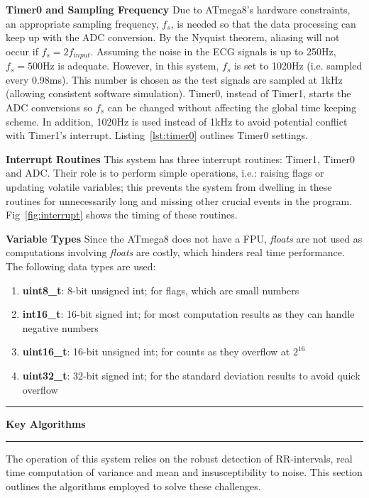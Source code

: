 \documentclass[11pt]{article}
\newcommand\question[2]{\vspace{.25in}\hrule\textbf{#1}\vspace{.5em}\hrule\vspace{.10in}}
\renewcommand\part[1]{\vspace{.10in}\textbf{#1}}
\begin{document}
\part{Timer0 and Sampling Frequency } \newline
Due to ATmega8's hardware constraints, an appropriate sampling frequency, $f_s$, is needed so that the data processing can keep up with the ADC conversion. By the Nyquist theorem, aliasing will not occur if $f_{s} = 2f_{input}$. Assuming the noise in the ECG signals is up to 250Hz, $f_{s} =500$Hz is adequate. However, in this system, $f_{s}$ is set to 1020Hz (i.e. sampled every 0.98ms). This number is chosen as the test signals are sampled at 1kHz (allowing consistent software simulation). Timer0, instead of Timer1, starts the ADC conversions so $f_s$ can be changed without affecting the global time keeping scheme. In addition, 1020Hz is used instead of 1kHz to avoid potential conflict with Timer1's interrupt. Listing~\ref{lst:timer0} outlines Timer0 settings.

\part{Interrupt Routines} \newline
This system has three interrupt routines: Timer1, Timer0 and ADC. Their role is to perform simple operations, i.e.: raising flags or updating volatile variables; this prevents the system from dwelling in these routines for unnecessarily long and missing other crucial events in the program. Fig~\ref{fig:interrupt} shows the timing of these routines.

%
\part{Variable Types} \newline
Since the ATmega8 does not have a FPU, \textit{floats} are not used as computations involving \textit{floats} are costly, which hinders real time performance. The following data types are used:
\begin{enumerate}
\item \textbf{uint8\_t}: 8-bit unsigned int; for flags, which are small numbers
\item \textbf{int16\_t}: 16-bit signed int; for most computation results as they can handle negative numbers
\item \textbf{uint16\_t}: 16-bit unsigned int; for counts as they overflow at $2^{16}$ 
\item \textbf{uint32\_t}: 32-bit signed int; for the standard deviation results to avoid quick overflow
\end{enumerate}
%
%
\question{Key Algorithms}{}
The operation of this system relies on the robust detection of RR-intervals, real time computation of variance and mean and insusceptibility to noise. This section outlines the algorithms employed to solve these challenges.
\end{document}
